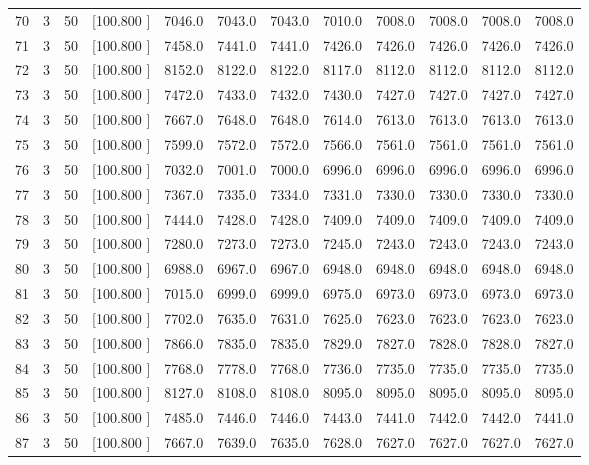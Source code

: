 \documentclass[12pt,a4paper]{article}
\begin{document}
\begin{center}
{\begin{tabular}{r r r r r r r r r r r r}
  70&  3& 50&[100.800   ]&  7046.0&  7043.0&  7043.0&  7010.0&  7008.0&  7008.0&  7008.0&  7008.0\\[-0.02in]
  71&  3& 50&[100.800   ]&  7458.0&  7441.0&  7441.0&  7426.0&  7426.0&  7426.0&  7426.0&  7426.0\\[-0.02in]
  72&  3& 50&[100.800   ]&  8152.0&  8122.0&  8122.0&  8117.0&  8112.0&  8112.0&  8112.0&  8112.0\\[-0.02in]
  73&  3& 50&[100.800   ]&  7472.0&  7433.0&  7432.0&  7430.0&  7427.0&  7427.0&  7427.0&  7427.0\\[-0.02in]
  74&  3& 50&[100.800   ]&  7667.0&  7648.0&  7648.0&  7614.0&  7613.0&  7613.0&  7613.0&  7613.0\\[-0.02in]
  75&  3& 50&[100.800   ]&  7599.0&  7572.0&  7572.0&  7566.0&  7561.0&  7561.0&  7561.0&  7561.0\\[-0.02in]
  76&  3& 50&[100.800   ]&  7032.0&  7001.0&  7000.0&  6996.0&  6996.0&  6996.0&  6996.0&  6996.0\\[-0.02in]
  77&  3& 50&[100.800   ]&  7367.0&  7335.0&  7334.0&  7331.0&  7330.0&  7330.0&  7330.0&  7330.0\\[-0.02in]
  78&  3& 50&[100.800   ]&  7444.0&  7428.0&  7428.0&  7409.0&  7409.0&  7409.0&  7409.0&  7409.0\\[-0.02in]
  79&  3& 50&[100.800   ]&  7280.0&  7273.0&  7273.0&  7245.0&  7243.0&  7243.0&  7243.0&  7243.0\\[-0.02in]
  80&  3& 50&[100.800   ]&  6988.0&  6967.0&  6967.0&  6948.0&  6948.0&  6948.0&  6948.0&  6948.0\\[-0.02in]
  81&  3& 50&[100.800   ]&  7015.0&  6999.0&  6999.0&  6975.0&  6973.0&  6973.0&  6973.0&  6973.0\\[-0.02in]
  82&  3& 50&[100.800   ]&  7702.0&  7635.0&  7631.0&  7625.0&  7623.0&  7623.0&  7623.0&  7623.0\\[-0.02in]
  83&  3& 50&[100.800   ]&  7866.0&  7835.0&  7835.0&  7829.0&  7827.0&  7828.0&  7828.0&  7827.0\\[-0.02in]
  84&  3& 50&[100.800   ]&  7768.0&  7778.0&  7768.0&  7736.0&  7735.0&  7735.0&  7735.0&  7735.0\\[-0.02in]
  85&  3& 50&[100.800   ]&  8127.0&  8108.0&  8108.0&  8095.0&  8095.0&  8095.0&  8095.0&  8095.0\\[-0.02in]
  86&  3& 50&[100.800   ]&  7485.0&  7446.0&  7446.0&  7443.0&  7441.0&  7442.0&  7442.0&  7441.0\\[-0.02in]
  87&  3& 50&[100.800   ]&  7667.0&  7639.0&  7635.0&  7628.0&  7627.0&  7627.0&  7627.0&  7627.0\\[-0.02in]

\end{tabular}}
\end{center}
\end{document}
